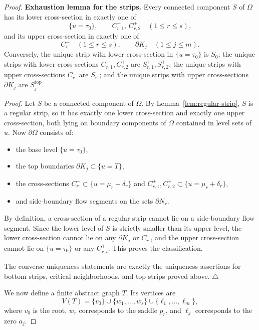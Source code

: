 \documentclass[12pt]{amsart}
\theoremstyle{definition}
\theoremstyle{remark}
\begin{document}
\begin{proof}
\medskip
\noindent\textbf{Exhaustion lemma for the strips.}
Every connected component $S$ of $\Omega$ has its lower cross-section in exactly one of
\[
\{u=\tau_0\}, \qquad C_{r,1}^+,\, C_{r,2}^+ \quad (1\le r\le s),
\]
and its upper cross-section in exactly one of
\[
C_r^- \quad (1\le r\le s), \qquad \partial K_j \quad (1\le j\le m).
\]
Conversely, the unique strip with lower cross-section in $\{u=\tau_0\}$ is $S_0$;
the unique strips with lower cross-sections $C_{r,1}^+,C_{r,2}^+$ are
$S_{r,1}^+,S_{r,2}^+$; the unique strips with upper cross-sections $C_r^-$ are
$S_r^-$; and the unique strips with upper cross-sections $\partial K_j$ are
$S_j^{\mathrm{top}}$.

\smallskip
\noindent\emph{Proof.}
Let $S$ be a connected component of $\Omega$. By Lemma~\ref{lem:regular-strip}, $S$ is a regular strip,
so it has exactly one lower cross-section and exactly one upper cross-section, both lying
on boundary components of $\Omega$ contained in level sets of $u$.
Now $\partial\Omega$ consists of:
\begin{itemize}
\item the base level $\{u=\tau_0\}$,
\item the top boundaries $\partial K_j\subset\{u=T\}$,
\item the cross-sections $C_r^-\subset\{u=\mu_r-\delta_r\}$ and
      $C_{r,1}^+,C_{r,2}^+\subset\{u=\mu_r+\delta_r\}$,
\item and side-boundary flow segments on the sets $\partial N_r$.
\end{itemize}
By definition, a cross-section of a regular strip cannot lie on a side-boundary flow
segment. Since the lower level of $S$ is strictly smaller than its upper level, the lower
cross-section cannot lie on any $\partial K_j$ or $C_r^-$, and the upper cross-section
cannot lie on $\{u=\tau_0\}$ or any $C_{r,i}^+$. This proves the classification.

The converse uniqueness statements are exactly the uniqueness assertions for
bottom strips, critical neighborhoods, and top strips proved above.
\hfill$\triangle$

We now define a finite abstract graph $T$. Its vertices are
\[
V(T)=\{v_0\}\cup\{w_1,\dots,w_s\}\cup\{\ell_1,\dots,\ell_m\},
\]
where $v_0$ is the root, $w_r$ corresponds to the saddle $p_r$, and $\ell_j$
corresponds to the zero $a_j$.


\end{proof}
\end{document}
